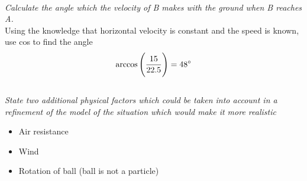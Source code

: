 \documentclass{article}[18pt]
\begin{document}
\\
\textit{Calculate the angle which the velocity of B makes with the ground when B reaches A.}\\
Using the knowledge that horizontal velocity is constant and the speed is known, use cos to find the angle
$$\arccos\Bigg(\frac{15}{22.5}\Bigg)=48\degree$$
\\
\textit{State two additional physical factors which could be taken into account in a refinement of
the model of the situation which would make it more realistic}
\begin{itemize}
\item Air resistance
\item Wind
\item Rotation of ball (ball is not a particle)
\end{itemize}
\end{document}
